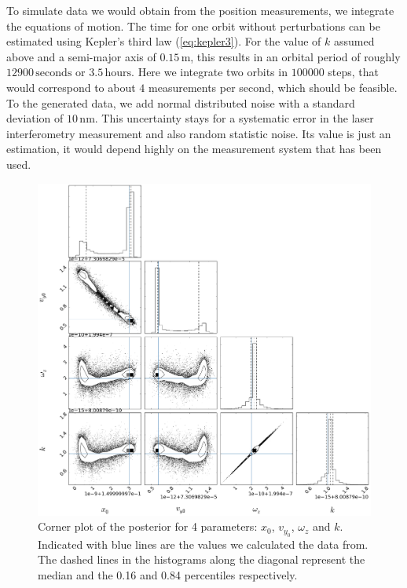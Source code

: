 \documentclass[prb,preprint]{revtex4-1}
\begin{document}
To simulate data we would obtain from the position measurements, we integrate the equations of motion. The time for one orbit without perturbations can be estimated using Kepler's third law (\ref{eq:kepler3}). For the value of $k$ assumed above and a semi-major axis of $0.15 \, \mathrm{m}$, this results in an orbital period of roughly $12900 \, \mathrm{seconds}$ or $3.5 \, \mathrm{hours}$. Here we integrate two orbits in $100000$ steps, that would correspond to about $4$ measurements per second, which should be feasible. To the generated data, we add normal distributed noise with a standard deviation of $10 \, \mathrm{nm}$. This uncertainty stays for a systematic error in the laser interferometry measurement and also random statistic noise. Its value is just an estimation, it would depend highly on the measurement system that has been used.\\

\begin{figure}[h]
	\centering
	\includegraphics[width=1.0\textwidth]{img/4cornerfit.png}
	\caption{Corner plot of the posterior for 4 parameters: $x_0$, $v_{y_0}$, $\omega_z$ and $k$. Indicated with blue lines are the values we calculated the data from. The dashed lines in the histograms along the diagonal represent the median and the 0.16 and 0.84 percentiles respectively.}
	\label{fig:plotCorner4}
\end{figure}
\end{document}
